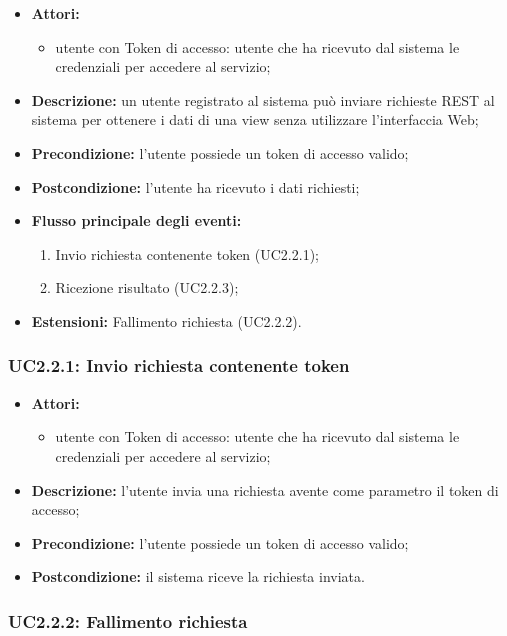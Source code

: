 \begin{itemize}
	\item \textbf{Attori:}
	\begin{itemize}
		\item utente con Token di accesso: utente che ha ricevuto dal sistema le credenziali per accedere al servizio;
	\end{itemize}
	\item \textbf{Descrizione:} un utente registrato al sistema può inviare richieste REST al sistema per ottenere i dati di una view senza utilizzare l'interfaccia Web;
	\item \textbf{Precondizione:} l'utente possiede un token di accesso valido;
	\item \textbf{Postcondizione:} l'utente ha ricevuto i dati richiesti;
	\item \textbf{Flusso principale degli eventi:}
	\begin{enumerate}
		\item Invio richiesta contenente token (UC2.2.1);
		\item Ricezione risultato (UC2.2.3);
	\end{enumerate}
	\item \textbf{Estensioni:} Fallimento richiesta (UC2.2.2).
\end{itemize}


\subsubsection{UC2.2.1: Invio richiesta contenente token}

\begin{itemize}
	\item \textbf{Attori:}
	\begin{itemize}
		\item utente con Token di accesso: utente che ha ricevuto dal sistema le credenziali per accedere al servizio;
	\end{itemize}
	\item \textbf{Descrizione:} l'utente invia una richiesta avente come parametro il token di accesso;
	\item \textbf{Precondizione:} l'utente possiede un token di accesso valido;
	\item \textbf{Postcondizione:} il sistema riceve la richiesta inviata.
\end{itemize}

\subsubsection{UC2.2.2: Fallimento richiesta}

